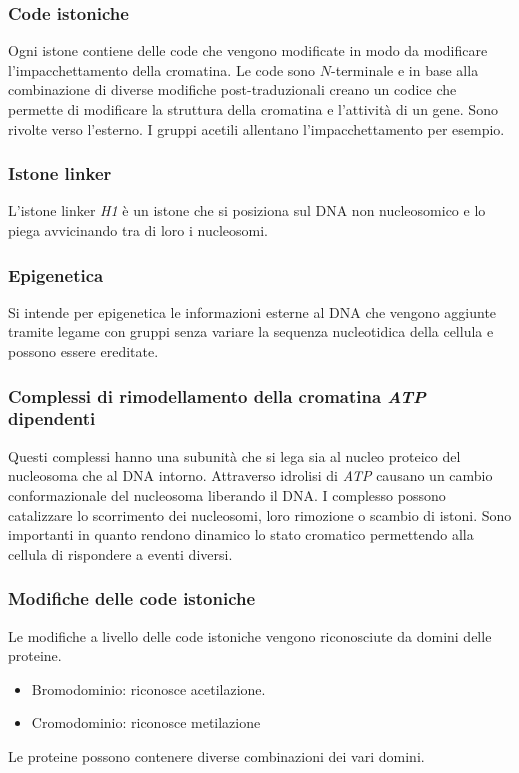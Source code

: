 		\subsubsection{Code istoniche}
		Ogni istone contiene delle code che vengono modificate in modo da modificare l'impacchettamento della cromatina.
		Le code sono $N$-terminale e in base alla combinazione di diverse modifiche post-traduzionali creano un codice che permette di modificare la struttura della cromatina e l'attivit\`a di un gene.
		Sono rivolte verso l'esterno.
		I gruppi acetili allentano l'impacchettamento per esempio.

		\subsubsection{Istone linker}
		L'istone linker \emph{H1} \`e un istone che si posiziona sul DNA non nucleosomico e lo piega avvicinando tra di loro i nucleosomi.

		\subsubsection{Epigenetica}
		Si intende per epigenetica le informazioni esterne al DNA che vengono aggiunte tramite legame con gruppi senza variare la sequenza nucleotidica della cellula e possono essere ereditate.

		\subsubsection{Complessi di rimodellamento della cromatina \emph{ATP} dipendenti}
		Questi complessi hanno una subunit\`a che si lega sia al nucleo proteico del nucleosoma che al DNA intorno.
		Attraverso idrolisi di \emph{ATP} causano un cambio conformazionale del nucleosoma liberando il DNA.
		I complesso possono catalizzare lo scorrimento dei nucleosomi, loro rimozione o scambio di istoni.
		Sono importanti in quanto rendono dinamico lo stato cromatico permettendo alla cellula di rispondere a eventi diversi.

		\subsubsection{Modifiche delle code istoniche}
		Le modifiche a livello delle code istoniche vengono riconosciute da domini delle proteine.
		\begin{multicols}{2}
			\begin{itemize}
				\item Bromodominio: riconosce acetilazione.
				\item Cromodominio: riconosce metilazione
			\end{itemize}
		\end{multicols}
		Le proteine possono contenere diverse combinazioni dei vari domini.

